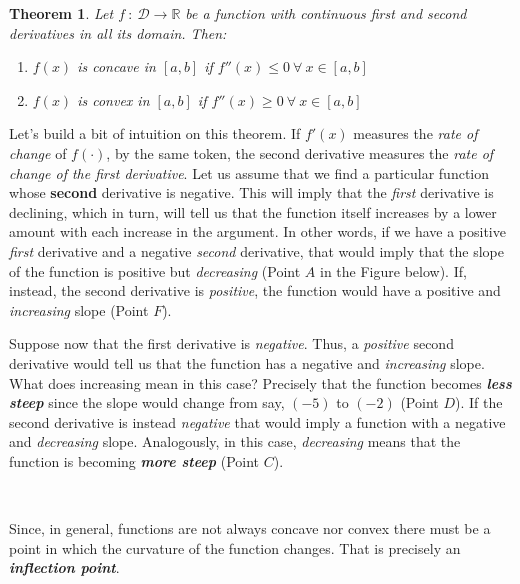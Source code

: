 \documentclass[11pt]{article}
\theoremstyle{definition}
\theoremstyle{plain}
\newtheorem{theorem}{Theorem}
\begin{document}
\begin{theorem}
Let \(f \: : \: \mathcal{D}\rightarrow\mathbb{R}\) be
a function with continuous first and second derivatives in all its
domain. Then: 
\begin{enumerate}
    \item \(f(x)\) is concave in \([a,b]\) if \(f''(x) \leq 0 \: \forall \: x\in[a,b]\) 
    \item \(f(x)\) is convex in \([a,b]\) if \(f''(x) \geq 0 \: \forall \: x\in[a,b]\)
\end{enumerate}
\end{theorem}

Let's build a bit of intuition on this theorem. If \(f'(x)\) measures
the \emph{rate of change} of \(f(\cdot)\), by the same token, the second
derivative measures the \emph{rate of change of the first derivative}.
Let us assume that we find a particular function whose \textbf{second}
derivative is negative. This will imply that the \emph{first} derivative
is declining, which in turn, will tell us that the function itself
increases by a lower amount with each increase in the argument. In other
words, if we have a positive \emph{first} derivative and a negative
\emph{second} derivative, that would imply that the slope of the
function is positive but \emph{decreasing} (Point \(A\) in the Figure
below). If, instead, the second derivative is \emph{positive}, the
function would have a positive and \emph{increasing} slope (Point
\(F\)).

Suppose now that the first derivative is \emph{negative}. Thus, a
\emph{positive} second derivative would tell us that the function has a
negative and \emph{increasing} slope. What does increasing mean in this
case? Precisely that the function becomes \textbf{\emph{less steep}}
since the slope would change from say, \((-5)\) to \((-2)\) (Point
\(D\)). If the second derivative is instead \emph{negative} that would
imply a function with a negative and \emph{decreasing} slope.
Analogously, in this case, \emph{decreasing} means that the function is
becoming \textbf{\emph{more steep}} (Point \(C\)).

    \begin{center}
    \end{center}
    { \hspace*{\fill} \\}
    
    Since, in general, functions are not always concave nor convex there
must be a point in which the curvature of the function changes. That is
precisely an \textbf{\emph{inflection point}}.
\end{document}
